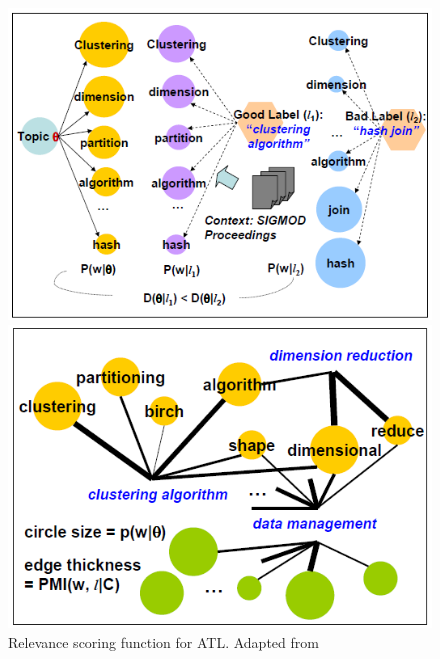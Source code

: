 \begin{figure}[t]
	\begin{minipage}[t]{0.5\textwidth}
		\includegraphics[width=\textwidth]{gfx/Mei/MeiGoodLabel.png}
	\end{minipage}
	\begin{minipage}[t]{0.512\textwidth}
		\includegraphics[width=\textwidth]{gfx/Mei/MeiScoring.png}
	\end{minipage}
	\caption[Relevance scoring function for \ac{ATL}]{Relevance scoring function for \ac{ATL}. Adapted from \cite{Mei2007}}
	\label{pic:ScoringFunction}
\end{figure}


